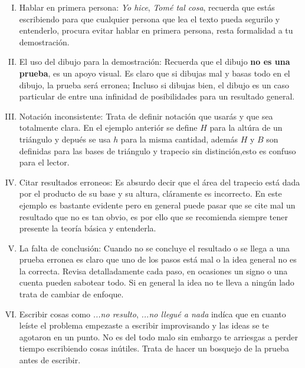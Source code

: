     \begin{enumerate}[I)]
      \item Hablar en primera persona:
        \textit{Yo hice},
        \textit{Tomé tal cosa},
        recuerda que estás escribiendo
        para que cualquier persona que lea el texto pueda
        segurilo y entenderlo,
        procura evitar hablar en primera persona,
        resta formalidad a tu demostración.

      \item El uso del dibujo para la demostración:
        Recuerda que el dibujo \textbf{no es una prueba},
        es un apoyo visual.
        Es claro que si dibujas mal y basas todo en el dibujo,
        la prueba será erronea;
        Incluso si dibujas bien,
        el dibujo es un caso particular de
        entre una infinidad de posibilidades para un resultado general.

      \item Notación inconsistente:
        Trata de definir notación que usarás
        y que sea totalmente clara.
        En el ejemplo anteriór se define $H$ para la altúra de un triángulo
        y depués se usa $h$ para la misma cantidad,
        además $H$ y $B$ son definidas para las bases de triángulo
        y trapecio sin distinción,esto es confuso para el lector.

      \item Citar resultados erroneos:
        Es absurdo decir que el área del trapecio está dada
        por el producto de su base y su altura,
        cláramente es incorrecto.
        En este ejemplo es bastante evidente
        pero en general puede pasar que se cite mal un resultado
        que no es tan obvio,
        es por ello que se recomienda
        siempre tener presente la teoría básica y entenderla.

      \item La falta de conclusión:
        Cuando no se concluye el resultado
        o se llega a una prueba erronea
        es claro que uno de los pasos está mal
        o la idea general no es la correcta.
        Revisa detalladamente cada paso,
        en ocasiones un signo o una cuenta pueden sabotear todo.
        Si en general la idea no te lleva a ningún lado
        trata de cambiar de enfoque.

      \item Escribir cosas como
        \textit{...no resulto}, \textit{...no llegué a nada}
        indíca que en cuanto leíste el problema
        empezaste a escribir improvisando
        y las ideas se te agotaron en un punto.
        No es del todo malo sin embargo te arriesgas a perder tiempo
        escribiendo cosas inútiles.
        Trata de hacer un bosquejo de la prueba antes de escribir.

    \end{enumerate}

